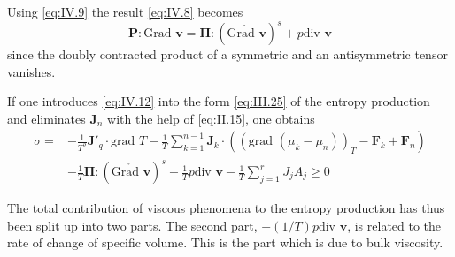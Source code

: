 Using \eqref{eq:IV.9} the result \eqref{eq:IV.8} becomes
\begin{equation}
\bm{P} : \textrm{Grad } \bm{v} = \bm{\Pi} : (\mathring{\textrm{Grad } \bm{v}} )^s +
p \textrm{div } \bm{v}
    \label{eq:IV.12}
\end{equation}
since the doubly contracted product of a symmetric and an antisymmetric tensor vanishes.

If one introduces \eqref{eq:IV.12} into the form \eqref{eq:III.25} of the entropy production and eliminates $\bm{J}_n$ with the help of \eqref{eq:II.15}, one obtains
\begin{equation}
\begin{split}
    \sigma = &- \frac{1}{T^2} \bm{J}'_q \cdot \textrm{grad } T - \frac{1}{T} \sum_{k=1}^{n-1} \bm{J}_k \cdot ((\textrm{grad } (\mu_k - \mu_n))_T - \bm{F}_k + \bm{F}_n)  \\
    &- \frac{1}{T} \bm{\Pi}: (\mathring{\textrm{Grad } \bm{v}})^s - \frac{1}{T} p \textrm{div } \bm{v} - \frac{1}{T} \sum_{j=1}^{r} J_j A_j \geq 0
\end{split}
    \label{eq:IV.13}
\end{equation}

The total contribution of viscous phenomena to the entropy production has thus been split up into two parts. The second part, $-(1/T) p \textrm{div } \bm{v}$, is related to the rate of change of specific volume. This is the part which is due to bulk viscosity.

